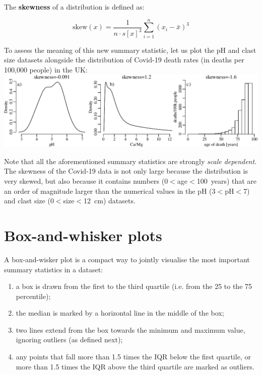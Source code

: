 The \textbf{skewness} of a distribution is defined as:

\begin{equation}
  \mbox{skew}(x) = \frac{1}{n \cdot s[x]^3}\sum\limits_{i=1}^{n}(x_i-\bar{x})^3
  \label{eq:skew}
\end{equation}

To assess the meaning of this new summary statistic, let us plot the
pH and clast size datasets alongside the distribution of Covid-19
death rates (in deaths per 100,000 people) in the UK:\\

\noindent\includegraphics[width=\textwidth]{../figures/skewness.pdf}
\begingroup
\endgroup

Note that all the aforementioned summary statistics are strongly
\emph{scale dependent}. The skewness of the Covid-19 data is not only
large because the distribution is very skewed, but also because it
contains numbers (0$<$age$<$100~years) that are an order of magnitude
larger than the numerical values in the pH (3$<$pH$<$7) and clast
size (0$<$size$<$12~cm) datasets.

\section{Box-and-whisker plots}
\label{sec:boxplots}

A box-and-wisker plot is a compact way to jointly visualise the most
important summary statistics in a dataset:

\begin{enumerate}
\item a box is drawn from the first to the third quartile (i.e. from
  the 25 to the 75 percentile);
\item the median is marked by a horizontal line in the middle of the box;
\item two lines extend from the box towards the minimum and maximum
  value, ignoring outliers (as defined next);
\item any points that fall more than 1.5 times the IQR below the first
  quartile, or more than 1.5 times the IQR above the third quartile
  are marked as outliers.
\end{enumerate}

